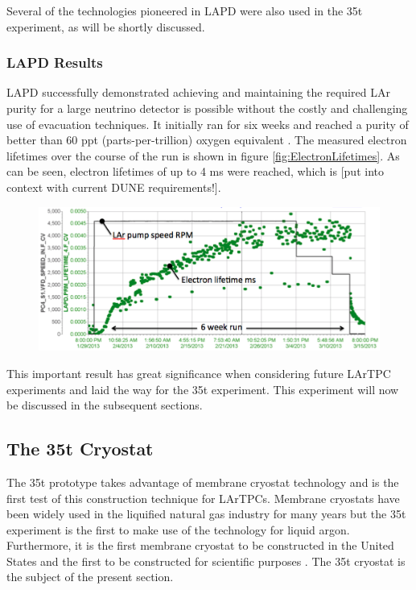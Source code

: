 Several of the technologies pioneered in LAPD were also used in the 35t experiment, as will be shortly discussed.

\subsubsection{LAPD Results}\label{sec:LAPDResults}

LAPD successfully demonstrated achieving and maintaining the required LAr purity for a large neutrino detector is possible without the costly and challenging use of evacuation techniques.  It initially ran for six weeks and reached a purity of better than 60 ppt (parts-per-trillion) oxygen equivalent \cite{LAPD}.  The measured electron lifetimes over the course of the run is shown in figure \ref{fig:ElectronLifetimes}.  As can be seen, electron lifetimes of up to 4 ms were reached, which is [put into context with current DUNE requirements!].

\begin{figure}[ht]
  \centering
  \includegraphics[width=15cm]{LAPDElectronLifetime.png}
  \caption{}
  \label{fig:LAPDElectronLifetime}
\end{figure}

This important result has great significance when considering future LArTPC experiments and laid the way for the 35t experiment.  This experiment will now be discussed in the subsequent sections.

\subsection{The 35t Cryostat}\label{sec:35tCryostat}

The 35t prototype takes advantage of membrane cryostat technology and is the first test of this construction technique for LArTPCs.  Membrane cryostats have been widely used in the liquified natural gas industry for many years but the 35t experiment is the first to make use of the technology for liquid argon.  Furthermore, it is the first membrane cryostat to be constructed in the United States and the first to be constructed for scientific purposes \cite{LBNE35tPhaseIOverview}.  The 35t cryostat is the subject of the present section.

